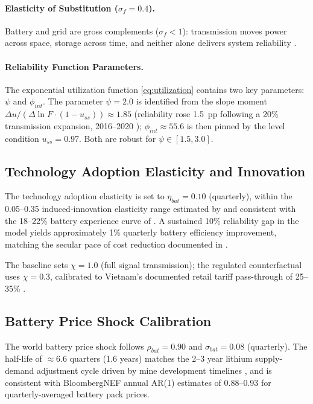 	\paragraph{Elasticity of Substitution ($\sigma_f = 0.4$).}
	Battery and grid are gross complements ($\sigma_f<1$): transmission moves power across space, storage across time, and neither alone delivers system reliability \citep{hart2019,hirth2013}.

	\paragraph{Reliability Function Parameters.}
	The exponential utilization function \eqref{eq:utilization} contains two key parameters: $\psi$ and $\phi_{int}$. The parameter $\psi=2.0$ is identified from the slope moment $\Delta u/(\Delta\ln F\cdot(1-u_{ss}))\approx 1.85$ (reliability rose 1.5~pp following a 20\% transmission expansion, 2016--2020 \citep{evn2023}); $\phi_{int}\approx 55.6$ is then pinned by the level condition $u_{ss}=0.97$. Both are robust for $\psi\in[1.5,3.0]$.
	
	
	\subsection{Technology Adoption Elasticity and Innovation}
	
		The technology adoption elasticity is set to $\eta_{bat} = 0.10$ (quarterly), within the 0.05--0.35 induced-innovation elasticity range estimated by \citet{popp2002} and consistent with the 18--22\% battery experience curve of \citet{kittner2017}. A sustained 10\% reliability gap in the model yields approximately 1\% quarterly battery efficiency improvement, matching the secular pace of cost reduction documented in \citet{way2022}.
	
	The baseline sets $\chi=1.0$ (full signal transmission); the regulated counterfactual uses $\chi=0.3$, calibrated to Vietnam's documented retail tariff pass-through of 25--35\% \citep{ieefa2022}.
	
	\subsection{Battery Price Shock Calibration}
	
	The world battery price shock follows $\rho_{bat} = 0.90$ and $\sigma_{bat} = 0.08$ (quarterly). The half-life of $\approx 6.6$ quarters (1.6 years) matches the 2--3 year lithium supply-demand adjustment cycle driven by mine development timelines \citep{bloombergnef2023}, and is consistent with BloombergNEF annual AR(1) estimates of 0.88--0.93 for quarterly-averaged battery pack prices.
	

